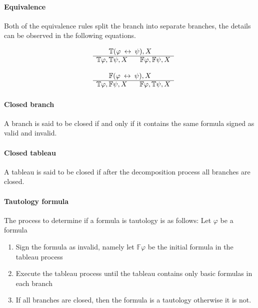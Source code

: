 \documentclass{article}
\begin{document}
		\paragraph{Equivalence}
Both of the equivalence rules split the branch into separate branches, the details can be observed in the following equations.
		\newline
		\noindent\begin{minipage}{.5\linewidth}
		\begin{align*}
			\begin{array}{rl}
				& \:\:\:\:\:\:\:\: \mathbb{T}(\varphi \: \leftrightarrow \: \psi), X \\
			      \cline{2-2}
			      & \mathbb{T}\varphi, \mathbb{T}\psi, X \:\:\:\:\:\:\:\: \mathbb{F}\varphi, \mathbb{F}\psi, X
			\end{array}
		\end{align*}
		\end{minipage}%
		\begin{minipage}{.5\linewidth}
		\begin{align*}
			\begin{array}{rl}
				& \:\:\:\:\:\:\:\: \mathbb{F}(\varphi \: \leftrightarrow \: \psi), X \\
			      \cline{2-2}
			      & \mathbb{T}\varphi, \mathbb{F}\psi, X \:\:\:\:\:\:\:\: \mathbb{F}\varphi, \mathbb{T}\psi, X
			\end{array}
		\end{align*}
		\end{minipage}
		\newline
		\paragraph{Closed branch}
A branch is said to be closed if and only if it contains the same formula signed as valid and invalid.

		\paragraph{Closed tableau}
A tableau is said to be closed if after the decomposition process all branches are closed.

		\paragraph{Tautology formula} 
The process to determine if a formula is tautology is as follows:
Let $\varphi$ be a formula 
\begin{enumerate}
	\item Sign the formula as invalid, namely let $\mathbb{F}\varphi$ be the initial formula in the tableau process
	\item Execute the tableau process until the tableau contains only basic formulas in each branch
	\item If all branches are closed, then the formula is a tautology otherwise it is not.
\end{enumerate}
\end{document}
